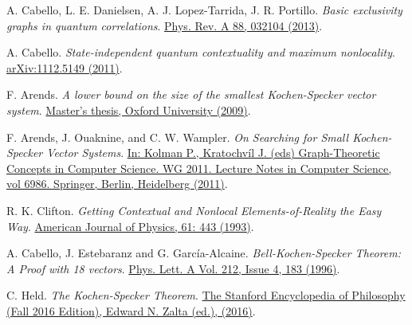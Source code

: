 \documentclass[twocolumn, a4paper, superscriptaddress,nofootinbib, accepted=2020-08-07, hyperref]{quantumarticle}
\def\textbf#1{{\bf #1}}
\begin{document}
\begin{thebibliography}{99}



A. Cabello, L. E. Danielsen, A. J. Lopez-Tarrida, J. R. Portillo. \textit{Basic exclusivity graphs in quantum correlations}. \href{https://doi.org/10.1103/PhysRevA.88.032104}{Phys. Rev. A 88, 032104 (2013)}.

A. Cabello. \textit{State-independent quantum contextuality and maximum nonlocality}.
\href{https://arxiv.org/abs/1112.5149}{arXiv:1112.5149 (2011)}.

F. Arends. 
\textit{A lower bound on the size of the smallest Kochen-Specker vector
system}. 
\href{http://www.cs.ox.ac.uk/people/joel.ouaknine/download/arends09.pdf}{Master’s thesis, Oxford University (2009)}.

F. Arends, J. Ouaknine, and C. W. Wampler. 
\textit{On Searching for Small Kochen-Specker Vector Systems}. 
\href{https://doi.org/10.1007/978-3-642-25870-1_4}{In: Kolman P., Kratochvíl J. (eds) Graph-Theoretic Concepts in Computer Science. WG 2011. Lecture Notes in Computer Science, vol 6986. Springer, Berlin, Heidelberg (2011)}.

R. K. Clifton. 
\textit{Getting Contextual and Nonlocal Elements-of-Reality the Easy Way}. 
\href{https://doi.org/10.1119/1.17239}{American Journal of Physics, 61: 443 (1993)}.

A. Cabello, J. Estebaranz and G. Garc\'{i}a-Alcaine.
\textit{Bell-Kochen-Specker Theorem: A Proof with 18 vectors}. 
\href{https://doi.org/10.1016/0375-9601(96)00134-X}{Phys. Lett. A Vol. 212, Issue 4, 183 (1996)}.



C. Held. \textit{The Kochen-Specker Theorem}. \href{https://plato.stanford.edu/entries/kochen-specker/}{The Stanford Encyclopedia of Philosophy (Fall 2016 Edition), Edward N. Zalta (ed.), (2016)}. 


\end{thebibliography}
\end{document}

